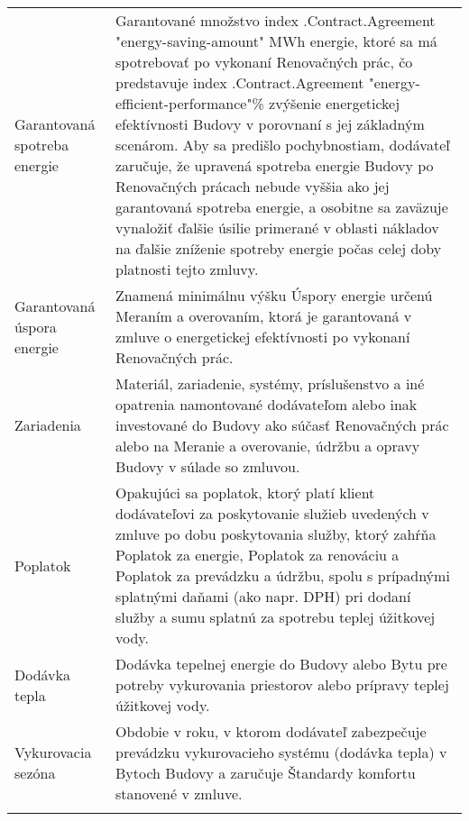 \documentclass[a4paper]{article}
\begin{document}
\begin{longtabu}{|X|X[2]|}
   \hline

   Garantovaná spotreba energie & Garantované množstvo {{index .Contract.Agreement "energy-saving-amount"}}  MWh energie, ktoré sa má spotrebovať po vykonaní Renovačných prác, čo predstavuje {{index .Contract.Agreement "energy-efficient-performance"}}\% zvýšenie energetickej efektívnosti Budovy v porovnaní s jej základným scenárom. Aby sa predišlo pochybnostiam, dodávateľ zaručuje, že upravená spotreba energie Budovy po Renovačných prácach nebude vyššia ako jej garantovaná spotreba energie, a osobitne sa zaväzuje vynaložiť ďalšie úsilie primerané v oblasti nákladov na ďalšie zníženie spotreby energie počas celej doby platnosti tejto zmluvy. \\\tabucline{}

   \hline

   Garantovaná úspora energie &Znamená minimálnu výšku Úspory energie určenú Meraním a overovaním, ktorá je garantovaná v zmluve o energetickej efektívnosti po vykonaní Renovačných prác.\\\tabucline{}

   \hline

   Zariadenia& Materiál, zariadenie, systémy, príslušenstvo a iné opatrenia namontované dodávateľom alebo inak investované do Budovy ako súčasť Renovačných prác alebo na Meranie a overovanie, údržbu a opravy Budovy v súlade so zmluvou.  \\\tabucline{}

   \hline

   Poplatok & Opakujúci sa poplatok, ktorý platí klient dodávateľovi za poskytovanie služieb uvedených v zmluve po dobu poskytovania služby, ktorý zahŕňa Poplatok za energie, Poplatok za renováciu a Poplatok za prevádzku a údržbu, spolu s prípadnými splatnými daňami (ako napr. DPH) pri dodaní služby a sumu splatnú za spotrebu teplej úžitkovej vody.\\\tabucline{}

   \hline

   Dodávka tepla & Dodávka tepelnej energie do Budovy alebo Bytu pre potreby vykurovania priestorov alebo prípravy teplej úžitkovej vody.\\\tabucline{}

   \hline

   Vykurovacia sezóna & Obdobie v roku, v ktorom dodávateľ zabezpečuje prevádzku vykurovacieho systému (dodávka tepla) v Bytoch Budovy a zaručuje Štandardy komfortu stanovené v zmluve.\\\tabucline{}


\end{longtabu}
\end{document}

